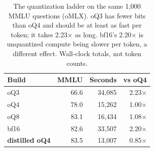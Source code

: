 \begin{table}[t]
\centering
\caption{The quantization ladder on the same 1{,}000 MMLU questions (oMLX). oQ3 has fewer bits than oQ4 and should be at least as fast per token; it takes 2.23$\times$ as long. bf16's 2.20$\times$ is unquantized compute being slower per token, a different effect. Wall-clock totals, not token counts.}
\label{tab:ladder}
\begin{tabular}{lrrr}
\toprule
Build & MMLU & Seconds & vs oQ4 \\
\midrule
oQ3 & 66.6 & 34,085 & 2.23$\times$ \\
oQ4 & 78.0 & 15,262 & 1.00$\times$ \\
oQ8 & 83.1 & 16,434 & 1.08$\times$ \\
bf16 & 82.6 & 33,507 & 2.20$\times$ \\
\textbf{distilled oQ4} & 83.5 & 13,007 & 0.85$\times$ \\
\bottomrule
\end{tabular}
\end{table}
